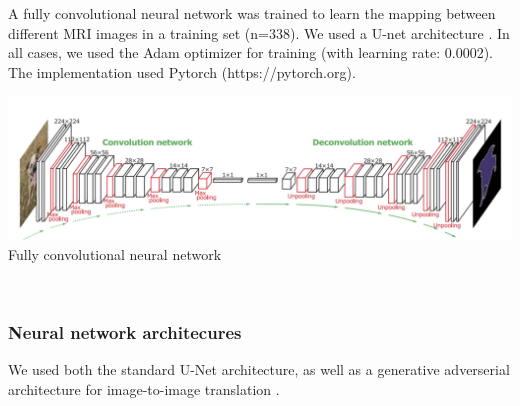 \documentclass[a0, portrait]{a0poster}
\begin{document}
\begin{multicols}{2}
A fully convolutional neural network was trained to learn the mapping
between different MRI images in a training set (n=338).  We used a U-net
architecture \cite{Ronneberger2015-ua}. In all cases, we used the Adam
optimizer for training (with learning rate: 0.0002). The implementation
used Pytorch (https://pytorch.org).


\begin{minipage}[b]{\linewidth}
\includegraphics[width=\linewidth]{fully-convolutional.png}
\center Fully convolutional neural network
\end{minipage}
\\


\subsubsection*{Neural network architecures}

We used both the standard U-Net architecture, as well as a generative
adverserial architecture for image-to-image translation
\cite{Isola2016-oc}.


\end{multicols}
\end{document}

